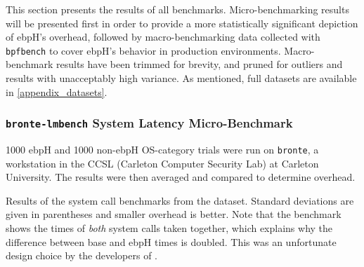 \documentclass[
  12pt]{findlay}
\newcommand{\passthrough}[1]{#1}
\begin{document}
\label{results-section}

This section presents the results of all benchmarks. Micro-benchmarking
results will be presented first in order to provide a more statistically
significant depiction of ebpH's overhead, followed by macro-benchmarking
data collected with \passthrough{\lstinline!bpfbench!} to cover ebpH's
behavior in production environments. Macro-benchmark results have been
trimmed for brevity, and pruned for outliers and results with
unacceptably high variance. As mentioned, full datasets are available in
\autoref{appendix_datasets}.

\hypertarget{bronte-lmbench-system-latency-micro-benchmark}{%
\subsubsection{\texorpdfstring{\texttt{bronte-lmbench} System Latency
Micro-Benchmark}{bronte-lmbench System Latency Micro-Benchmark}}\label{bronte-lmbench-system-latency-micro-benchmark}}

\label{bronte_lmbench}

1000 ebpH and 1000 non-ebpH OS-category trials were run on
\passthrough{\lstinline!bronte!}, a workstation in the CCSL (Carleton
Computer Security Lab) at Carleton University. The results were then
averaged and compared to determine overhead.

\begin{table}
    \caption[Results of the system call benchmarks from the  dataset]{
        Results of the system call benchmarks from the  dataset.
        Standard deviations are given in parentheses and smaller overhead is better. Note that the 
        benchmark shows the times of \emph{both} system calls taken together, which explains why the difference
        between base and ebpH times is doubled. This was an unfortunate design choice by the developers of .
    }
    \label{bronte_lmbench_syscall}
    
\end{table}
\end{document}
